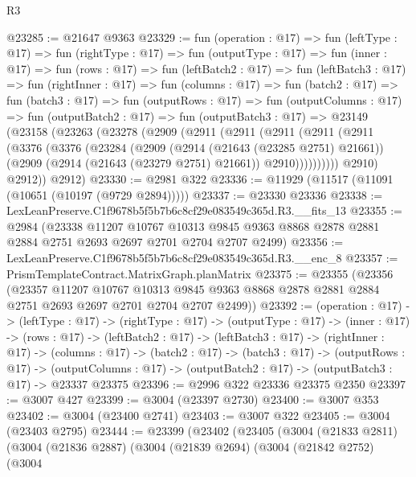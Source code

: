 \begin{lexlean}{R3}
\begin{coremodule}
@23285 := @21647 @9363
@23329 := fun (operation : @17) =>
  fun (leftType : @17) =>
  fun (rightType : @17) =>
  fun (outputType : @17) =>
  fun (inner : @17) =>
  fun (rows : @17) =>
  fun (leftBatch2 : @17) =>
  fun (leftBatch3 : @17) =>
  fun (rightInner : @17) =>
  fun (columns : @17) =>
  fun (batch2 : @17) =>
  fun (batch3 : @17) =>
  fun (outputRows : @17) =>
  fun (outputColumns : @17) =>
  fun (outputBatch2 : @17) =>
  fun (outputBatch3 : @17) =>
  @23149
    (@23158
      (@23263
        (@23278
          (@2909
            (@2911
              (@2911
                (@2911
                  (@2911
                    (@2911
                      (@3376
                        (@3376
                          (@23284
                            (@2909
                              (@2914 (@21643 (@23285 @2751) @21661))
                              (@2909 (@2914 (@21643 (@23279 @2751) @21661)) @2910))))))))))
            @2910)
          @2912))
      @2912)
@23330 := @2981 @322
@23336 := @11929 (@11517 (@11091 (@10651 (@10197 (@9729 @2894)))))
@23337 := @23330 @23336
@23338 := LexLeanPreserve.C1f9678b5f5b7b6c8cf29e083549c365d.R3.__fits_13
@23355 := @2984
    (@23338
      @11207
      @10767
      @10313
      @9845
      @9363
      @8868
      @2878
      @2881
      @2884
      @2751
      @2693
      @2697
      @2701
      @2704
      @2707
      @2499)
@23356 := LexLeanPreserve.C1f9678b5f5b7b6c8cf29e083549c365d.R3.__enc_8
@23357 := PrismTemplateContract.MatrixGraph.planMatrix
@23375 := @23355
    (@23356
      (@23357
        @11207
        @10767
        @10313
        @9845
        @9363
        @8868
        @2878
        @2881
        @2884
        @2751
        @2693
        @2697
        @2701
        @2704
        @2707
        @2499))
@23392 := (operation : @17) ->
  (leftType : @17) ->
  (rightType : @17) ->
  (outputType : @17) ->
  (inner : @17) ->
  (rows : @17) ->
  (leftBatch2 : @17) ->
  (leftBatch3 : @17) ->
  (rightInner : @17) ->
  (columns : @17) ->
  (batch2 : @17) ->
  (batch3 : @17) ->
  (outputRows : @17) ->
  (outputColumns : @17) -> (outputBatch2 : @17) -> (outputBatch3 : @17) -> @23337 @23375
@23396 := @2996 @322 @23336 @23375 @2350
@23397 := @3007 @427
@23399 := @3004 (@23397 @2730)
@23400 := @3007 @353
@23402 := @3004 (@23400 @2741)
@23403 := @3007 @322
@23405 := @3004 (@23403 @2795)
@23444 := @23399
    (@23402
      (@23405
        (@3004
          (@21833 @2811)
          (@3004
            (@21836 @2887)
            (@3004
              (@21839 @2694)
              (@3004
                (@21842 @2752)
                (@3004

\end{coremodule}
\end{lexlean}
